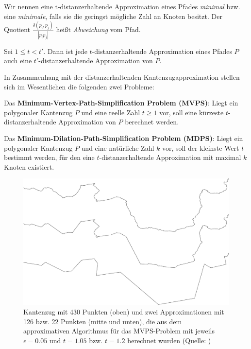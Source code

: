 	Wir nennen eine t-distanzerhaltende Approximation eines Pfades \emph{minimal} bzw. eine \emph{minimale}, falls sie die geringst mögliche Zahl an Knoten besitzt.
	Der Quotient $\frac{\delta(p_i, p_j)}{|p_ip_j|}$ heißt \emph{Abweichung} vom Pfad.
	\begin{corollary}
		\label{cor:approximations}
		Sei $1 \leq t < t'$. Dann ist jede $t$-distanzerhaltende Approximation eines Pfades $P$ auch eine $t'$-distanzerhaltende Approximation von $P$.
	\end{corollary}

	In Zusammenhang mit der distanzerhaltenden Kantenzugapproximation stellen sich im Wesentlichen die folgenden zwei Probleme:
	
	\noindent Das \textbf{Minimum-Vertex-Path-Simplification Problem (MVPS)}: Liegt ein polygonaler Kantenzug $P$ und eine reelle Zahl $t \geq 1$ vor, soll eine kürzeste $t$-distanzerhaltende Approximation von $P$ berechnet werden.
	
	\noindent Das \textbf{Minimum-Dilation-Path-Simplification Problem (MDPS)}: Liegt ein polygonaler Kantenzug $P$ und eine natürliche Zahl $k$ vor, soll der kleinste Wert $t$ bestimmt werden, für den eine $t$-distanzerhaltende Approximation mit maximal $k$ Knoten existiert.

    \begin{figure}
    	\centering
    	\begin{minipage}{.8\linewidth}
    		 \includegraphics[scale=0.15]{approximation_example}
    	\end{minipage}
    	\caption{Kantenzug mit 430 Punkten (oben) und zwei Approximationen mit 126 bzw. 22 Punkten (mitte und unten), die aus dem approximativen Algorithmus für das MVPS-Problem mit jeweils $\epsilon = 0.05$ und $t = 1.05$ bzw. $t = 1.2$ berechnet wurden (Quelle: \cite{gudmundsson})}
    \end{figure}
